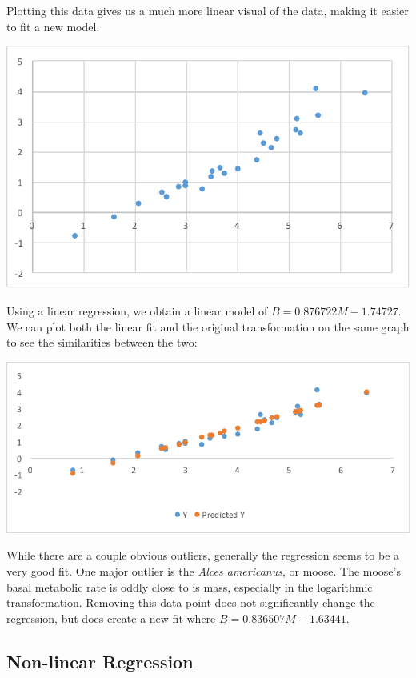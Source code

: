 \documentclass[10pt,letterpaper]{article}
\begin{document}
			Plotting this data gives us a much more linear visual of the data, making it easier to fit a new model.
			\newline \newline
			\centerline{\includegraphics{Picture8.pdf}}
			\newline \newline
			Using a linear regression, we obtain a linear model of $B = 0.876722M - 1.74727$. We can plot both the linear fit and the original transformation on the same graph to see the similarities between the two:
			\newline \newline
			\centerline{\includegraphics{Picture9.pdf}}
			\newline \newline
			While there are a couple obvious outliers, generally the regression seems to be a very good fit. One major outlier is the \emph{Alces americanus}, or moose. The moose's basal metabolic rate is oddly close to is mass, especially in the logarithmic transformation. Removing this data point does not significantly change the regression, but does create a new fit where $B = 0.836507M - 1.63441$.
		\subsection{Non-linear Regression}
\end{document}
